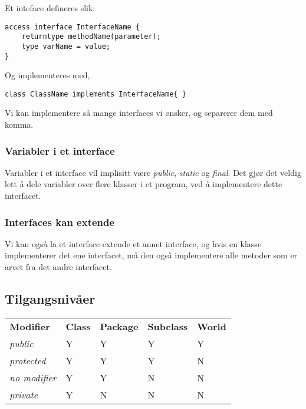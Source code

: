 \documentclass[11pt]{article}
\begin{document}
Et inteface defineres slik:


\begin{verbatim}
access interface InterfaceName {
    returntype methodName(parameter);
    type varName = value;
}
\end{verbatim}

Og implementeres med, 


\begin{verbatim}
class ClassName implements InterfaceName{ }
\end{verbatim}

Vi kan implementere så mange interfaces vi ønsker, og separerer dem
med komma.
\subsubsection{Variabler i et interface}
\label{sec-13-2-1}


Variabler i et interface vil implisitt være \emph{public}, \emph{static} og
\emph{final}. Det gjør det veldig lett å dele variabler over flere klasser
i et program, ved å implementere dette interfacet.
\subsubsection{Interfaces kan extende}
\label{sec-13-2-2}


Vi kan også la et interface extende et annet interface, og hvis en
klasse implementerer det ene interfacet, må den også implementere alle
metoder som er arvet fra det andre interfacet.
\subsection{Tilgangsnivåer}
\label{sec-13-3}


\begin{center}
\begin{tabular}{lllll}
 \textbf{Modifier}   &  \textbf{Class}  &  \textbf{Package}  &  \textbf{Subclass}  &  \textbf{World}  \\
 \emph{public}       &  Y               &  Y                 &  Y                  &  Y               \\
 \emph{protected}    &  Y               &  Y                 &  Y                  &  N               \\
 \emph{no modifier}  &  Y               &  Y                 &  N                  &  N               \\
 \emph{private}      &  Y               &  N                 &  N                  &  N               \\
\end{tabular}
\end{center}
\end{document}
